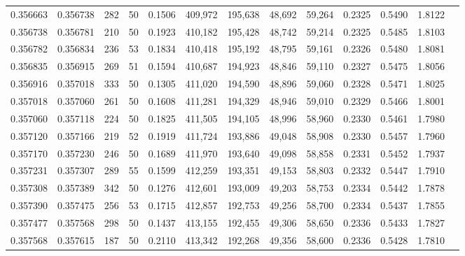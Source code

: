 \begin{tabular}{rrrrrrrrrrrrr}
0.356663 & 0.356738 &   282 &  50 &                                     0.1506 & 409,972 & 195,638 &  48,692 &  59,264 & 0.2325 & 0.5490 & 1.8122 \\
0.356738 & 0.356781 &   210 &  50 &                                     0.1923 & 410,182 & 195,428 &  48,742 &  59,214 & 0.2325 & 0.5485 & 1.8103 \\
0.356782 & 0.356834 &   236 &  53 &                                     0.1834 & 410,418 & 195,192 &  48,795 &  59,161 & 0.2326 & 0.5480 & 1.8081 \\
0.356835 & 0.356915 &   269 &  51 &                                     0.1594 & 410,687 & 194,923 &  48,846 &  59,110 & 0.2327 & 0.5475 & 1.8056 \\
0.356916 & 0.357018 &   333 &  50 &                                     0.1305 & 411,020 & 194,590 &  48,896 &  59,060 & 0.2328 & 0.5471 & 1.8025 \\
0.357018 & 0.357060 &   261 &  50 &                                     0.1608 & 411,281 & 194,329 &  48,946 &  59,010 & 0.2329 & 0.5466 & 1.8001 \\
0.357060 & 0.357118 &   224 &  50 &                                     0.1825 & 411,505 & 194,105 &  48,996 &  58,960 & 0.2330 & 0.5461 & 1.7980 \\
0.357120 & 0.357166 &   219 &  52 &                                     0.1919 & 411,724 & 193,886 &  49,048 &  58,908 & 0.2330 & 0.5457 & 1.7960 \\
0.357170 & 0.357230 &   246 &  50 &                                     0.1689 & 411,970 & 193,640 &  49,098 &  58,858 & 0.2331 & 0.5452 & 1.7937 \\
0.357231 & 0.357307 &   289 &  55 &                                     0.1599 & 412,259 & 193,351 &  49,153 &  58,803 & 0.2332 & 0.5447 & 1.7910 \\
0.357308 & 0.357389 &   342 &  50 &                                     0.1276 & 412,601 & 193,009 &  49,203 &  58,753 & 0.2334 & 0.5442 & 1.7878 \\
0.357390 & 0.357475 &   256 &  53 &                                     0.1715 & 412,857 & 192,753 &  49,256 &  58,700 & 0.2334 & 0.5437 & 1.7855 \\
0.357477 & 0.357568 &   298 &  50 &                                     0.1437 & 413,155 & 192,455 &  49,306 &  58,650 & 0.2336 & 0.5433 & 1.7827 \\
0.357568 & 0.357615 &   187 &  50 &                                     0.2110 & 413,342 & 192,268 &  49,356 &  58,600 & 0.2336 & 0.5428 & 1.7810 \\

\end{tabular}
